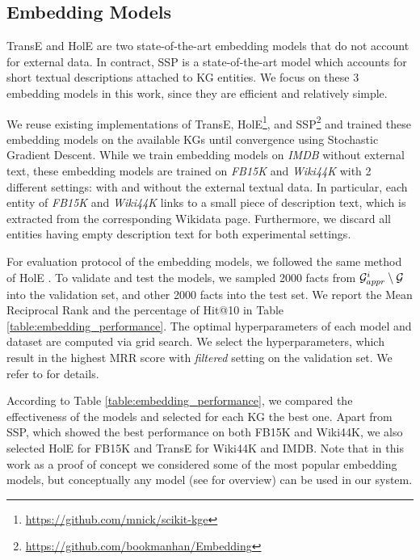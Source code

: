 \subsection{Embedding Models} 

TransE \cite{Bordes:NIPS2013} and HolE \cite{DBLP:conf/aaai/NickelRP16} are two state-of-the-art embedding models that do not account for external data. In contract, SSP \cite{DBLP:conf/aaai/0005HMZ17} is a state-of-the-art model which accounts for short textual descriptions attached to KG entities. We focus on these 3 embedding models in this work, since they are efficient and relatively simple.


We reuse existing implementations of TransE, HolE\footnote{\url{https://github.com/mnick/scikit-kge}}, and SSP\footnote{\url{https://github.com/bookmanhan/Embedding}} and trained these embedding models on the available KGs until convergence using Stochastic Gradient Descent. While we train embedding models on \textit{IMDB} without external text, these embedding models are trained on \textit{FB15K} and \textit{Wiki44K} with 2 different settings: with and without the external textual data. In particular, each entity of \textit{FB15K} and \textit{Wiki44K} links to a small piece of description text, which is extracted from the corresponding Wikidata page. Furthermore, we discard all entities having empty description text for both experimental settings.

For evaluation protocol of the embedding models, we followed the same method of HolE \cite{DBLP:conf/aaai/NickelRP16}. To validate and test the models, we sampled 2000 facts from $\mathcal{G}^i_{appr} \setminus \mathcal{G}$ into the validation set, and other 2000 facts into the test set. We report the Mean Reciprocal Rank and the percentage of Hit@10 in Table \ref{table:embedding_performance}. The optimal hyperparameters  of each model and dataset are computed via grid search. We select the hyperparameters, which result in the highest MRR score with \textit{filtered} setting on the validation set. We refer to \cite{DBLP:conf/aaai/NickelRP16} for details.

According to Table \ref{table:embedding_performance}, we compared the effectiveness of the models and selected for each KG the best one. Apart from SSP, which showed the best performance on both FB15K and Wiki44K, we also selected HolE for FB15K and TransE for Wiki44K and IMDB. Note that in this work as a proof of concept we considered some of the most popular embedding models, but conceptually any model (see \cite{DBLP:journals/tkde/WangMWG17} for overview) can be used in our system.

